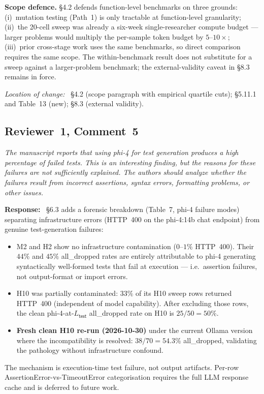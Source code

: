 \documentclass[11pt,a4paper]{article}
\newenvironment{reviewerquote}
  {\begin{tcolorbox}[colback=black!5, colframe=black!15, boxrule=0.3pt,
                     arc=1pt, left=6pt, right=6pt, top=3pt, bottom=3pt,
                     breakable]\itshape\small}
  {\end{tcolorbox}}
\newcommand{\rcomment}[2]{\subsection*{Reviewer~#1, Comment~#2}}
\newcommand{\response}{\noindent\textbf{Response:}\ }
\newcommand{\loc}{\par\smallskip\noindent\textit{Location of change:}\ }
\begin{document}
\textbf{Scope defence.} \S4.2 defends function-level benchmarks on three grounds: (i)~mutation testing (Path~1) is only tractable at function-level granularity; (ii)~the 20-cell sweep was already a six-week single-researcher compute budget --- larger problems would multiply the per-sample token budget by $5$--$10\times$; (iii)~prior cross-stage work \citep{Allamanis2024RTC, Zhang2025CodingTriangle, Li2024MBCT} uses the same benchmarks, so direct comparison requires the same scope. The within-benchmark result does not substitute for a sweep against a larger-problem benchmark; the external-validity caveat in \S8.3 remains in force.

\loc{} \S4.2 (scope paragraph with empirical quartile cuts); \S5.11.1 and Table~13 (new); \S8.3 (external validity).

\rcomment{1}{5}

\begin{reviewerquote}
The manuscript reports that using phi-4 for test generation produces a high percentage of failed tests. This is an interesting finding, but the reasons for these failures are not sufficiently explained. The authors should analyze whether the failures result from incorrect assertions, syntax errors, formatting problems, or other issues.
\end{reviewerquote}

\response{}
\S6.3 adds a forensic breakdown (Table~7, phi-4 failure modes) separating infrastructure errors (HTTP~400 on the phi-4:14b chat endpoint) from genuine test-generation failures:
\begin{itemize}
  \item M2 and H2 show no infrastructure contamination ($0$--$1\%$ HTTP~400). Their $44\%$ and $45\%$ \textsf{all\_dropped} rates are entirely attributable to phi-4 generating syntactically well-formed tests that fail at execution --- i.e.\ assertion failures, not output-format or import errors.
  \item H10 was partially contaminated: $33\%$ of its H10 sweep rows returned HTTP~400 (independent of model capability). After excluding those rows, the clean phi-4-at-$L_{\textsf{test}}$ \textsf{all\_dropped} rate on H10 is $25/50 = 50\%$.
  \item \textbf{Fresh clean H10 re-run (2026-10-30)} under the current Ollama version where the incompatibility is resolved: $38/70 = 54.3\%$ \textsf{all\_dropped}, validating the pathology without infrastructure confound.
\end{itemize}
The mechanism is execution-time test failure, not output artifacts. Per-row AssertionError-vs-TimeoutError categorisation requires the full LLM response cache and is deferred to future work.
\end{document}
